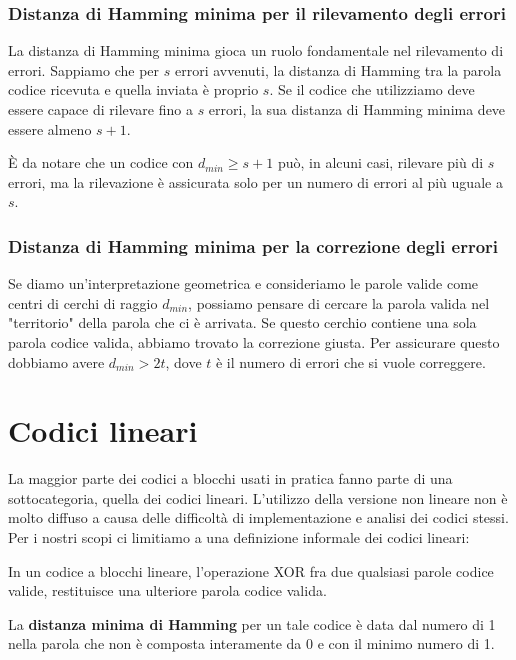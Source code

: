         \subsubsection{Distanza di Hamming minima per il rilevamento degli errori}
            La distanza di Hamming minima gioca un ruolo fondamentale nel rilevamento di errori. Sappiamo che per $s$ errori avvenuti, la distanza di Hamming tra la parola codice ricevuta e quella inviata è proprio $s$. Se il codice che utilizziamo deve essere capace di rilevare fino a $s$ errori, la sua distanza di Hamming minima deve essere almeno $s+1$.
            
            È da notare che un codice con $d_{min} \geq s+1$ può, in alcuni casi, rilevare più di $s$ errori, ma la rilevazione è assicurata solo per un numero di errori al più uguale a $s$.
            
        \subsubsection{Distanza di Hamming minima per la correzione degli errori}
            Se diamo un'interpretazione geometrica e consideriamo le parole valide come centri di cerchi di raggio $d_{min}$, possiamo pensare di cercare la parola valida nel "territorio" della parola che ci è arrivata. Se questo cerchio contiene una sola parola codice valida, abbiamo trovato la correzione giusta. Per assicurare questo dobbiamo avere $d_{min} > 2t$, dove $t$ è il numero di errori che si vuole correggere.
            
\section{Codici lineari}
    La maggior parte dei codici a blocchi usati in pratica fanno parte di una sottocategoria, quella dei codici lineari. L'utilizzo della versione non lineare non è molto diffuso a causa delle difficoltà di implementazione e analisi dei codici stessi. Per i nostri scopi ci limitiamo a una definizione informale dei codici lineari:
    \begin{center}
        In un codice a blocchi lineare, l'operazione XOR fra due qualsiasi parole codice valide, restituisce una ulteriore parola codice valida.
    \end{center}
    
    La \textbf{distanza minima di Hamming} per un tale codice è data dal numero di 1 nella parola che non è composta interamente da 0 e con il minimo numero di 1.
    

